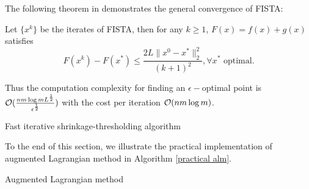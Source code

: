 \documentclass{article}
\newcommand{\prox}{\mathrm{prox}}
\begin{document}
The following theorem in \cite{beck2009fast} demonstrates the general convergence of FISTA:
\begin{theorem}
Let $\{x^k\}$ be the iterates of FISTA, then for any $k\ge 1$, $F(x) =f(x)+g(x)$ satisfies
\begin{equation}
F(x^k)-F(x^*) \le \frac{2L\|x^0-x^*\|_2^2}{(k+1)^2},\forall x^*\text{ optimal}.
\end{equation}
\end{theorem}
Thus the computation complexity for finding an $\epsilon-$optimal point is $\mathcal O(\frac{nm\log m L^\frac{1}{2}}{\epsilon^\frac{1}{2}})$ with the cost per iteration $\mathcal O(nm\log m)$.
 \begin{algorithm}[H]
\caption{Fast iterative shrinkage-thresholding algorithm}
\begin{algorithmic}[1]\label{fista}
\STATE{Solve $x^k = \argmin_x \prox_{g(x)/L}(y^k-\frac{1}{L}\grad f(y^k)$}
\ENDWHILE
{}
\end{algorithmic}
 \end{algorithm}
To the end of this section, we illustrate the practical implementation of augmented Lagrangian method in Algorithm \ref{practical alm}.
\begin{algorithm}[H]
\caption{Augmented Lagrangian method}
\begin{algorithmic}[1]\label{practical alm}
\ENDWHILE 
{}
\end{algorithmic}
\end{algorithm}
\end{document}
